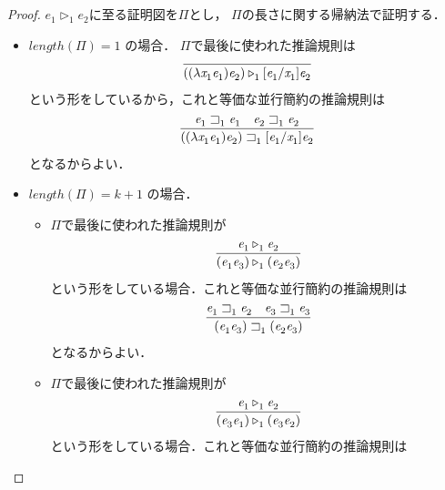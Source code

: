 \documentclass{ltjsbook}%
\begin{document}
\begin{proof}%
  $\mathit{e}_1^{}\triangleright_1^{}\mathit{e}_2^{}$に至る証明図を$\Pi$とし，%
  $\Pi$の長さに関する帰納法で証明する．%
  \begin{itemize}%
  \item $length(\Pi)=1$ の場合．%
    $\Pi$で最後に使われた推論規則は%
    \begin{equation}%
      \infer{%
        ((\lambda\mathit{x}_1^{}\mathit{e}_1^{})\mathit{e}_2^{})\triangleright_1^{}%
        [\mathit{e}_1^{}/\mathit{x}_1^{}]\mathit{e}_2^{}%
      }{%
      }%
    \end{equation}%
    という形をしているから，これと等価な並行簡約の推論規則は%
    \begin{equation}%
      \infer{%
        ((\lambda\mathit{x}_1^{}\mathit{e}_1^{})\mathit{e}_2^{})\sqsupset_1^{}%
        [\mathit{e}_1^{}/\mathit{x}_1^{}]\mathit{e}_2^{}%
      }{%
        \mathit{e}_1^{}\sqsupset_1^{}\mathit{e}_1^{}%
      &%
        \mathit{e}_2^{}\sqsupset_1^{}\mathit{e}_2^{}%
      }%
    \end{equation}%
    となるからよい．%
  \item $length(\Pi)=k + 1$ の場合．%
    \begin{itemize}%
    \item$\Pi$で最後に使われた推論規則が%
    \begin{equation}%
      \infer{%
        (\mathit{e}_1^{}\mathit{e}_3^{})\triangleright_1^{}(\mathit{e}_2^{}\mathit{e}_3^{})%
      }{%
        \mathit{e}_1^{}\triangleright_1^{}\mathit{e}_2^{}%
      }%
    \end{equation}%
    という形をしている場合．これと等価な並行簡約の推論規則は%
    \begin{equation}%
      \infer{%
        (\mathit{e}_1^{}\mathit{e}_3^{})\sqsupset_1^{}(\mathit{e}_2^{}\mathit{e}_3^{})%
      }{%
        \mathit{e}_1^{}\sqsupset_1^{}\mathit{e}_2^{}%
      &%
        \mathit{e}_3^{}\sqsupset_1^{}\mathit{e}_3^{}%
      }%
    \end{equation}%
    となるからよい．%
    \item$\Pi$で最後に使われた推論規則が%
    \begin{equation}%
      \infer{%
        (\mathit{e}_3^{}\mathit{e}_1^{})\triangleright_1^{}(\mathit{e}_3^{}\mathit{e}_2^{})%
      }{%
        \mathit{e}_1^{}\triangleright_1^{}\mathit{e}_2^{}%
      }%
    \end{equation}%
    という形をしている場合．これと等価な並行簡約の推論規則は%
    \begin{equation}%

\end{equation}
\end{itemize}
\end{itemize}
\end{proof}
\end{document}
